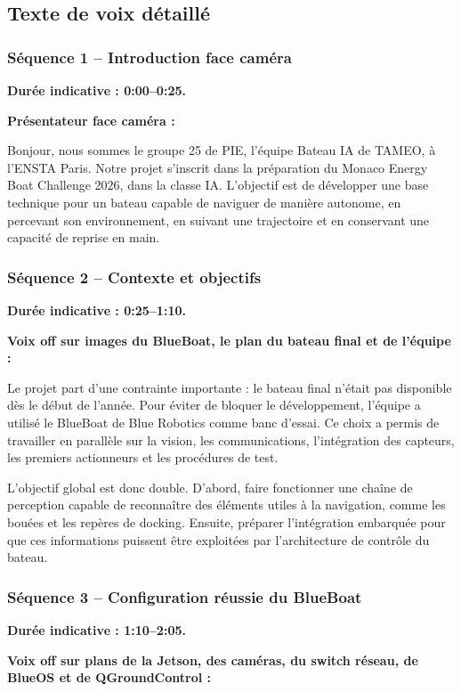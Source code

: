\documentclass[11pt,letterpaper]{article}
\begin{document}
\subsection{Texte de voix détaillé}

\subsubsection*{Séquence 1 -- Introduction face caméra}
\textbf{Durée indicative : 0:00--0:25.}

\textbf{Présentateur face caméra :}

Bonjour, nous sommes le groupe 25 de PIE, l'équipe Bateau IA de TAMEO, à l'ENSTA Paris. 
Notre projet s'inscrit dans la préparation du Monaco Energy Boat Challenge 2026, dans la classe IA. L'objectif est de développer une base technique pour un bateau capable de naviguer de manière autonome, en percevant son environnement, en suivant une trajectoire et en conservant une capacité de reprise en main.

\subsubsection*{Séquence 2 -- Contexte et objectifs}
\textbf{Durée indicative : 0:25--1:10.}

\textbf{Voix off sur images du BlueBoat, le plan du bateau final et de l'équipe :}

Le projet part d'une contrainte importante : le bateau final n'était pas disponible dès le début de l'année. Pour éviter de bloquer le développement, l'équipe a utilisé le BlueBoat de Blue Robotics comme banc d'essai. Ce choix a permis de travailler en parallèle sur la vision, les communications, l'intégration des capteurs, les premiers actionneurs et les procédures de test.

L'objectif global est donc double. D'abord, faire fonctionner une chaîne de perception capable de reconnaître des éléments utiles à la navigation, comme les bouées et les repères de docking. Ensuite, préparer l'intégration embarquée pour que ces informations puissent être exploitées par l'architecture de contrôle du bateau.

\subsubsection*{Séquence 3 -- Configuration réussie du BlueBoat}
\textbf{Durée indicative : 1:10--2:05.}

\textbf{Voix off sur plans de la Jetson, des caméras, du switch réseau, de BlueOS et de QGroundControl :}
\end{document}
